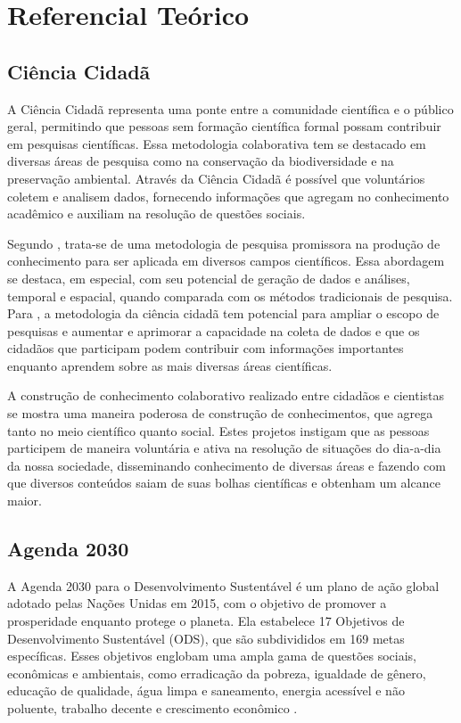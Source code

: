 
\chapter{Referencial Teórico}\label{referencial-teorico}

\section{Ciência Cidadã}

A Ciência Cidadã representa uma ponte entre a comunidade científica e o público geral, permitindo que pessoas sem formação científica formal possam contribuir em pesquisas científicas. Essa metodologia colaborativa tem se destacado em diversas áreas de pesquisa como na conservação da biodiversidade e na preservação ambiental. Através da Ciência Cidadã é possível que voluntários coletem e analisem dados, fornecendo informações que agregam no conhecimento acadêmico e auxiliam na resolução de questões sociais.

Segundo , trata-se de uma metodologia de pesquisa promissora na produção de conhecimento para ser aplicada em diversos campos científicos. Essa abordagem se destaca, em especial, com seu potencial de  geração de dados e análises, temporal e espacial, quando comparada com os métodos tradicionais de pesquisa. Para , a metodologia da ciência cidadã tem potencial para ampliar o escopo de pesquisas e aumentar e aprimorar a capacidade na coleta de dados e que os cidadãos que participam podem contribuir com informações importantes enquanto aprendem sobre as mais diversas áreas científicas.

A construção de conhecimento colaborativo realizado entre cidadãos e cientistas se mostra uma maneira poderosa de construção de conhecimentos, que agrega tanto no meio científico quanto social. Estes projetos instigam que as pessoas participem de maneira voluntária e ativa na resolução de situações do dia-a-dia da nossa sociedade, disseminando conhecimento de diversas áreas e fazendo com que diversos conteúdos saiam de suas bolhas científicas e obtenham um alcance maior.

\section{Agenda 2030}

A Agenda 2030 para o Desenvolvimento Sustentável é um plano de ação global adotado pelas Nações Unidas em 2015, com o objetivo de promover a prosperidade enquanto protege o planeta. Ela estabelece 17 Objetivos de Desenvolvimento Sustentável (ODS), que são subdivididos em 169 metas específicas. Esses objetivos englobam uma ampla gama de questões sociais, econômicas e ambientais, como erradicação da pobreza, igualdade de gênero, educação de qualidade, água limpa e saneamento, energia acessível e não poluente, trabalho decente e crescimento econômico \cite{onu2015ods}.

